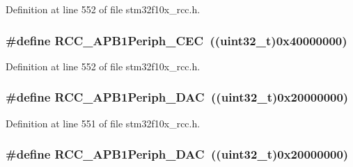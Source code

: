 Definition at line 552 of file stm32f10x\+\_\+rcc.\+h.

\subsubsection[{\texorpdfstring{R\+C\+C\+\_\+\+A\+P\+B1\+Periph\+\_\+\+C\+EC}{RCC_APB1Periph_CEC}}]{\setlength{\rightskip}{0pt plus 5cm}\#define R\+C\+C\+\_\+\+A\+P\+B1\+Periph\+\_\+\+C\+EC~(({\bf uint32\+\_\+t})0x40000000)}\hypertarget{group___a_p_b1__peripheral_gaa96437b649e13586945f40dac318a0ae}{}\label{group___a_p_b1__peripheral_gaa96437b649e13586945f40dac318a0ae}


Definition at line 552 of file stm32f10x\+\_\+rcc.\+h.

\subsubsection[{\texorpdfstring{R\+C\+C\+\_\+\+A\+P\+B1\+Periph\+\_\+\+D\+AC}{RCC_APB1Periph_DAC}}]{\setlength{\rightskip}{0pt plus 5cm}\#define R\+C\+C\+\_\+\+A\+P\+B1\+Periph\+\_\+\+D\+AC~(({\bf uint32\+\_\+t})0x20000000)}\hypertarget{group___a_p_b1__peripheral_ga8d019a727701634822c19371b6aaabb5}{}\label{group___a_p_b1__peripheral_ga8d019a727701634822c19371b6aaabb5}


Definition at line 551 of file stm32f10x\+\_\+rcc.\+h.

\subsubsection[{\texorpdfstring{R\+C\+C\+\_\+\+A\+P\+B1\+Periph\+\_\+\+D\+AC}{RCC_APB1Periph_DAC}}]{\setlength{\rightskip}{0pt plus 5cm}\#define R\+C\+C\+\_\+\+A\+P\+B1\+Periph\+\_\+\+D\+AC~(({\bf uint32\+\_\+t})0x20000000)}\hypertarget{group___a_p_b1__peripheral_ga8d019a727701634822c19371b6aaabb5}{}\label{group___a_p_b1__peripheral_ga8d019a727701634822c19371b6aaabb5}


